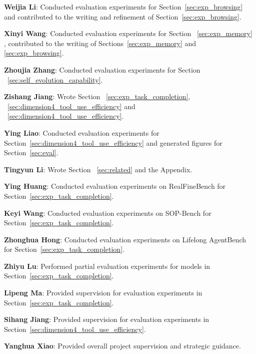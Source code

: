 \documentclass[]{kw_latex_template}
\begin{document}
\noindent\textbf{Weijia Li}: Conducted evaluation experiments for Section~\ref{sec:exp_browsing} and contributed to the writing and refinement of Section~\ref{sec:exp_browsing}.

\noindent\textbf{Xinyi Wang}: Conducted evaluation experiments for Section ~\ref{sec:exp_memory} , contributed to the writing of Sections~\ref{sec:exp_memory} and \ref{sec:exp_browsing}.

\noindent\textbf{Zhoujia Zhang}: Conducted evaluation experiments for Section ~\ref{sec:self_evolution_capability}.

\noindent\textbf{Zishang Jiang}: Wrote Section ~\ref{sec:exp_task_completion}, ~\ref{sec:dimension4_tool_use_efficiency} and ~\ref{sec:dimension4_tool_use_efficiency}.

\noindent\textbf{Ying Liao}: Conducted evaluation experiments for Section~\ref{sec:dimension4_tool_use_efficiency} and generated figures for Section~\ref{sec:eval}.

\noindent\textbf{Tingyun Li}: Wrote Section ~\ref{sec:related} and the Appendix.

\noindent\textbf{Ying Huang}: Conducted evaluation experiments on RealFineBench for Section~\ref{sec:exp_task_completion}.

\noindent\textbf{Keyi Wang}: Conducted evaluation experiments on SOP-Bench for Section~\ref{sec:exp_task_completion}.

\noindent\textbf{Zhonghua Hong}: Conducted evaluation experiments on Lifelong AgentBench for Section~\ref{sec:exp_task_completion}.

\noindent\textbf{Zhiyu Lu}: Performed partial evaluation experiments for models in Section~\ref{sec:exp_task_completion}.

\noindent\textbf{Lipeng Ma}: Provided supervision for evaluation experiments in Section~\ref{sec:exp_task_completion}.

\noindent\textbf{Sihang Jiang}: Provided supervision for evaluation experiments in Section~\ref{sec:dimension4_tool_use_efficiency}.

\noindent\textbf{Yanghua Xiao}: Provided overall project supervision and strategic guidance.


\end{document}
